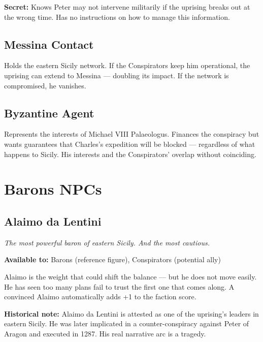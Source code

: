 \textbf{Secret:} Knows Peter may not intervene militarily if the
uprising breaks out at the wrong time. Has no instructions on how
to manage this information.

\subsection{Messina Contact}

Holds the eastern Sicily network. If the Conspirators keep him
operational, the uprising can extend to Messina --- doubling its
impact. If the network is compromised, he vanishes.

\subsection{Byzantine Agent}

Represents the interests of Michael VIII Palaeologus. Finances the
conspiracy but wants guarantees that Charles's expedition will be
blocked --- regardless of what happens to Sicily. His interests and
the Conspirators' overlap without coinciding.

\secsep

\section{Barons NPCs}

\subsection{Alaimo da Lentini}
\textit{The most powerful baron of eastern Sicily. And the most cautious.}


\textbf{Available to:} Barons (reference figure), Conspirators
(potential ally)

Alaimo is the weight that could shift the balance --- but he does not
move easily. He has seen too many plans fail to trust the first one
that comes along. A convinced Alaimo automatically adds +1 to the
faction score.

\textbf{Historical note:} Alaimo da Lentini is attested as one of the
uprising's leaders in eastern Sicily. He was later implicated in a
counter-conspiracy against Peter of Aragon and executed in 1287.
His real narrative arc is a tragedy.

